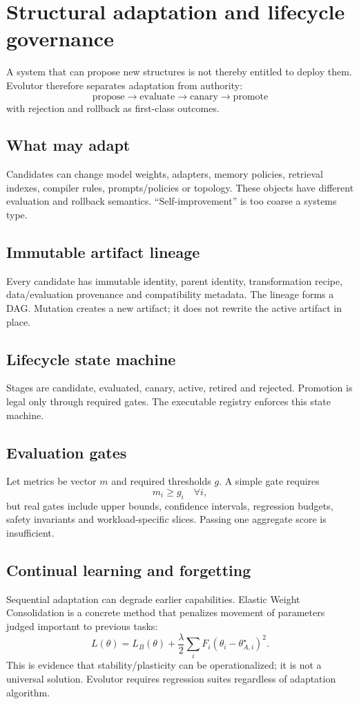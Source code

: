 \chapter{Structural adaptation and lifecycle governance}
A system that can propose new structures is not thereby entitled to deploy them. Evolutor therefore separates adaptation from authority:
\[
\text{propose}\rightarrow\text{evaluate}\rightarrow\text{canary}\rightarrow\text{promote}
\]
with rejection and rollback as first-class outcomes.

\section{What may adapt}
Candidates can change model weights, adapters, memory policies, retrieval indexes, compiler rules, prompts/policies or topology. These objects have different evaluation and rollback semantics. ``Self-improvement'' is too coarse a systems type.

\section{Immutable artifact lineage}
Every candidate has immutable identity, parent identity, transformation recipe, data/evaluation provenance and compatibility metadata. The lineage forms a DAG. Mutation creates a new artifact; it does not rewrite the active artifact in place.

\section{Lifecycle state machine}
Stages are candidate, evaluated, canary, active, retired and rejected. Promotion is legal only through required gates. The executable registry enforces this state machine.

\section{Evaluation gates}
Let metrics be vector $m$ and required thresholds $g$. A simple gate requires
\[
m_i\ge g_i\quad\forall i,
\]
but real gates include upper bounds, confidence intervals, regression budgets, safety invariants and workload-specific slices. Passing one aggregate score is insufficient.

\section{Continual learning and forgetting}
Sequential adaptation can degrade earlier capabilities. Elastic Weight Consolidation is a concrete method that penalizes movement of parameters judged important to previous tasks:
\[
L(\theta)=L_B(\theta)+\frac{\lambda}{2}\sum_i F_i(\theta_i-\theta_{A,i}^\star)^2.
\]
This is evidence that stability/plasticity can be operationalized; it is not a universal solution. Evolutor requires regression suites regardless of adaptation algorithm.

